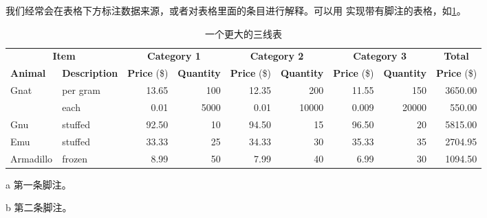 我们经常会在表格下方标注数据来源，或者对表格里面的条目进行解释。可以用
 实现带有脚注的表格，如\ref{tab:bigtable}。

\begin{table}[!htb]
  \centering
  \begin{threeparttable}[b]
    \caption{一个更大的三线表}
    \label{tab:bigtable}
    \begin{tabular}{@{}llrrrrrrr@{}} \toprule
      \multicolumn{2}{c}{\textbf{Item}} & \multicolumn{2}{c}{\textbf{Category 1}} & \multicolumn{2}{c}{\textbf{Category 2}} & \multicolumn{2}{c}{\textbf{Category 3}} & \multicolumn{1}{c}{\textbf{Total}}                                                                                     \\ \cmidrule(r){1-2} \cmidrule(lr){3-4} \cmidrule(lr){5-6} \cmidrule(lr){7-8} \cmidrule(l){9-9}
      \textbf{Animal}                   & \textbf{Description}                    & \textbf{Price} (\$)                     & \textbf{Quantity}                       & \textbf{Price} (\$)                & \textbf{Quantity} & \textbf{Price} (\$) & \textbf{Quantity} & \textbf{Price} (\$) \\ \midrule
      Gnat                              & per gram\tnote{a}                       & 13.65                                   & 100                                     & 12.35                              & 200               & 11.55               & 150               & 3650.00             \\
                                        & each                                    & 0.01                                    & 5000                                    & 0.01                               & 10000             & 0.009               & 20000             & 550.00              \\
      Gnu                               & stuffed                                 & 92.50                                   & 10                                      & 94.50                              & 15                & 96.50               & 20                & 5815.00             \\
      Emu                               & stuffed                                 & 33.33                                   & 25                                      & 34.33                              & 30                & 35.33               & 35                & 2704.95             \\
      Armadillo                         & frozen                                  & 8.99                                    & 50                                      & 7.99                               & 40                & 6.99                & 30\tnote{b}       & 1094.50             \\ \bottomrule
    \end{tabular}
    \begin{tablenotes}
      \item [a] 第一条脚注。
      \item [b] 第二条脚注。
    \end{tablenotes}
  \end{threeparttable}
\end{table}

